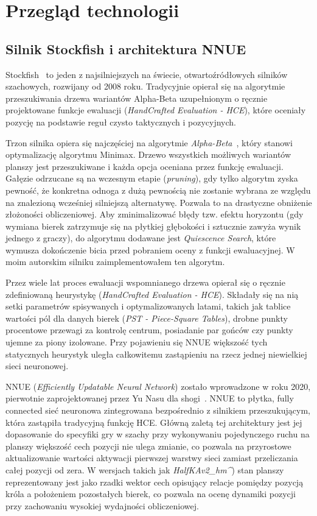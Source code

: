 \documentclass[12pt,a4paper]{report}
\begin{document}
\chapter{Przegląd technologii}

\section{Silnik Stockfish i architektura NNUE}

Stockfish~\cite{stockfish} to jeden z najsilniejszych na świecie, otwartoźródłowych silników szachowych, rozwijany od 2008 roku. Tradycyjnie opierał się na algorytmie przeszukiwania drzewa wariantów Alpha-Beta uzupełnionym o ręcznie projektowane funkcje ewaluacji (\textit{HandCrafted Evaluation - HCE}), które oceniały pozycję na podstawie reguł czysto taktycznych i pozycyjnych.

Trzon silnika opiera się najczęściej na algorytmie \textit{Alpha-Beta}~\cite{knuth1975alphabeta}, który stanowi optymalizację algorytmu Minimax. Drzewo wszystkich możliwych wariantów planszy jest przeszukiwane i każda opcja oceniana przez funkcję ewaluacji. Gałęzie odrzucane są na wczesnym etapie (\textit{pruning}), gdy tylko algorytm zyska pewność, że konkretna odnoga z dużą pewnością nie zostanie wybrana ze względu na znalezioną wcześniej silniejszą alternatywę. Pozwala to na drastyczne obniżenie złożoności obliczeniowej. Aby zminimalizować błędy tzw. efektu horyzontu (gdy wymiana bierek zatrzymuje się na płytkiej głębokości i sztucznie zawyża wynik jednego z graczy), do algorytmu dodawane jest \textit{Quiescence Search}, które wymusza dokończenie bicia przed pobraniem oceny z funkcji ewaluacyjnej. W moim autorskim silniku zaimplementowałem ten algorytm.

Przez wiele lat proces ewaluacji wspomnianego drzewa opierał się o ręcznie zdefiniowaną heurystykę (\textit{HandCrafted Evaluation - HCE}). Składały się na nią setki parametrów spisywanych i optymalizowanych latami, takich jak tablice wartości pól dla danych bierek (\textit{PST - Piece-Square Tables}), drobne punkty procentowe przewagi za kontrolę centrum, posiadanie par gońców czy punkty ujemne za piony izolowane. Przy pojawieniu się NNUE większość tych statycznych heurystyk uległa całkowitemu zastąpieniu na rzecz jednej niewielkiej sieci neuronowej.

NNUE (\textit{Efficiently Updatable Neural Network}) zostało wprowadzone w roku 2020, pierwotnie zaprojektowanej przez Yu Nasu dla shogi~\cite{nasu2018nnue}. NNUE to płytka, fully connected sieć neuronowa zintegrowana bezpośrednio z silnikiem przeszukującym, która zastąpiła tradycyjną funkcję HCE. Główną zaletą tej architektury jest jej dopasowanie do specyfiki gry w szachy przy wykonywaniu pojedynczego ruchu na planszy większość cech pozycji nie ulega zmianie, co pozwala na przyrostowe aktualizowanie wartości aktywacji pierwszej warstwy sieci zamiast przeliczania całej pozycji od zera. W wersjach takich jak \textit{HalfKAv2\_hm\string^}) stan planszy reprezentowany jest jako rzadki wektor cech opisujący relacje pomiędzy pozycją króla a położeniem pozostałych bierek, co pozwala na ocenę dynamiki pozycji przy zachowaniu wysokiej wydajności obliczeniowej.
\end{document}
